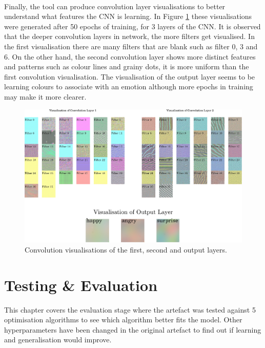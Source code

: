 \documentclass[report, 11pt, oneside]{dissertation}
\begin{document}
\ \ \ \

Finally, the tool can produce convolution layer visualisations to better understand what features the CNN is learning. In Figure \ref{fig:cnn_visualisation} these visualisations were generated after 50 epochs of training, for 3 layers of the CNN. It is observed that the deeper convolution layers in network, the more filters get visualised. In the first visualisation there are many filters that are blank such as filter 0, 3 and 6. On the other hand, the second convolution layer shows more distinct features and patterns such as colour lines and grainy dots, it is more uniform than the first convolution visualisation. The visualisation of the output layer seems to be learning colours to associate with an emotion although more epochs in training may make it more clearer.

\begin{figure}[!htb]
   \centering
	\includegraphics[scale=0.65]{figure_30.pdf}
	\caption[Convolution visualisations.]{Convolution visualisations of the first, second and output layers.}
	\label{fig:cnn_visualisation}
\end{figure}


\chapter{Testing \& Evaluation} \label{chap:testing_evaluation}

This chapter covers the evaluation stage where the artefact was tested against 5 optimisation algorithms to see which algorithm better fits the model. Other hyperparameters have been changed in the original artefact to find out if learning and generalisation would improve.
\end{document}
